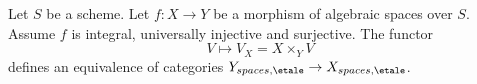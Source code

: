 %
\begin{theorem}
\label{theorem-topological-invariance}
Let $S$ be a scheme.
Let $f : X \to Y$ be a morphism of algebraic spaces over $S$.
Assume $f$ is integral, universally injective and surjective.
The functor
$$
V \longmapsto V_X = X \times_Y V
$$
defines an equivalence of categories
$Y_{spaces, \etale} \to X_{spaces, \etale}$.
\end{theorem}

